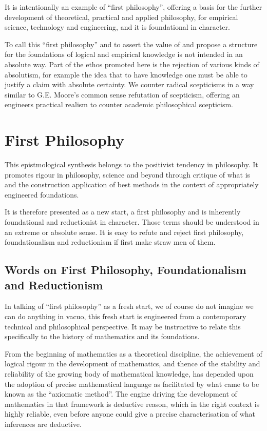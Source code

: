 \documentclass[10pt,titlepage]{book}
\begin{document}
It is intentionally an example of ``first philosophy'', offering a basis for the further development of theoretical, practical and applied philosophy, for empirical science, technology and engineering, and it is foundational in character.

To call this ``first philosophy'' and to assert the value of and propose a structure for the foundations of logical and empirical knowledge is not intended in an absolute way.
Part of the ethos promoted here is the rejection of various kinds of absolutism, for example the idea that to have knowledge one must be able to justify a claim with absolute certainty.
We counter radical scepticisms in a way similar to G.E. Moore's common sense refutation of scepticism, offering an engineers practical realism to counter academic philosophical scepticism.

\section{First Philosophy}

This epistmological synthesis belongs to the positivist tendency in philosophy.
It promotes rigour in philosophy, science and beyond through critique of what is and the construction application of best methods in the context of appropriately engineered foundations.

It is therefore presented as a new start, a first philosophy and is inherently foundational and reductionist in character.
Those terms should be understood in an extreme or absolute sense.
It is easy to refute and reject first philosophy, foundationalism and reductionism if first make straw men of them.

\subsection{Words on First Philosophy, Foundationalism and Reductionism}

In talking of ``first philosophy'' as a fresh start, we of course do not imagine we can do anything in vacuo, this fresh start is engineered from a contemporary technical and philosophical perspective.
It may be instructive to relate this specifically to the history of mathematics and its foundations.

From the beginning of mathematics as a theoretical discipline, the achievement of logical rigour in the development of mathematics, and thence of the stability and reliability of the growing body of mathematical knowledge, has depended upon the adoption of precise mathematical language as facilitated by what came to be known as the ``axiomatic method''.
The engine driving the development of mathematics in that framework is deductive reason, which in the right context is highly reliable, even before anyone could give a precise characterisation of what inferences are deductive.
\end{document}
